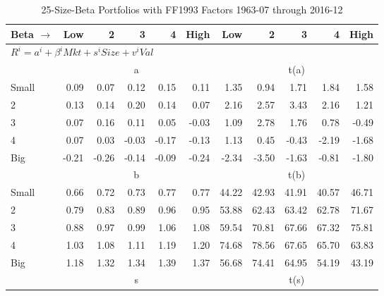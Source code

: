 
\begin{table}[!ht]
\centering
\caption{25-Size-Beta Portfolios with FF1993 Factors 1963-07 through 2016-12}
\begin{tabular}{lrrrrrrrrrr}
  \toprule
    Beta $\rightarrow$ & Low & 2 & 3 & 4 & High & Low & 2 & 3 & 4 & High \\ 
  \midrule
  \multicolumn{11}{l}{$R^i=a^i+\beta^iMkt+s^iSize+v^iVal$} \\

  
    
      & \multicolumn{5}{c}{a} & \multicolumn{5}{c}{t(a)}
    
    \\
      \cmidrule(r){2-6} \cmidrule(r){7-11}

    Small   & 0.09  & 0.07  & 0.12  & 0.15  & 0.11  & 1.35  & 0.94  & 1.71  & 1.84  & 1.58  \\
         2  & 0.13  & 0.14  & 0.20  & 0.14  & 0.07  & 2.16  & 2.57  & 3.43  & 2.16  & 1.21  \\
         3  & 0.07  & 0.16  & 0.11  & 0.05  & -0.03  & 1.09  & 2.78  & 1.76  & 0.78  & -0.49  \\
         4  & 0.07  & 0.03  & -0.03  & -0.17  & -0.13  & 1.13  & 0.45  & -0.43  & -2.19  & -1.68  \\
    Big     & -0.21  & -0.26  & -0.14  & -0.09  & -0.24  & -2.34  & -3.50  & -1.63  & -0.81  & -1.80  \\

  
    
      & \multicolumn{5}{c}{b} & \multicolumn{5}{c}{t(b)}
    
    \\
      \cmidrule(r){2-6} \cmidrule(r){7-11}

    Small   & 0.66  & 0.72  & 0.73  & 0.77  & 0.77  & 44.22  & 42.93  & 41.91  & 40.57  & 46.71  \\
         2  & 0.79  & 0.83  & 0.89  & 0.96  & 0.95  & 53.88  & 62.43  & 63.42  & 62.78  & 71.67  \\
         3  & 0.88  & 0.97  & 0.99  & 1.06  & 1.08  & 59.54  & 70.81  & 67.66  & 67.32  & 75.81  \\
         4  & 1.03  & 1.08  & 1.11  & 1.19  & 1.20  & 74.68  & 78.56  & 67.65  & 65.70  & 63.83  \\
    Big     & 1.18  & 1.32  & 1.34  & 1.39  & 1.37  & 56.68  & 74.41  & 64.95  & 54.19  & 43.19  \\

  
    
      & \multicolumn{5}{c}{s} & \multicolumn{5}{c}{t(s)}
    

\end{tabular}
\end{table}
